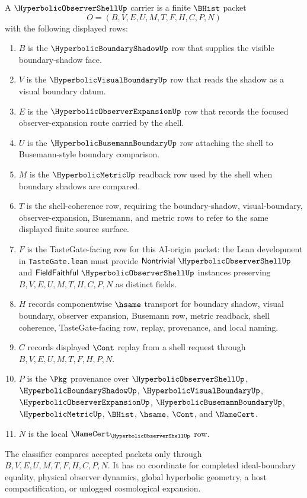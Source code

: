 \begin{definition}
\label{def:hyperbolic-observer-shell-carrier}
A $\HyperbolicObserverShellUp$ carrier is a finite $\BHist$ packet
$$
O=(B,V,E,U,M,T,F,H,C,P,N)
$$
with the following displayed rows:
\begin{enumerate}
\item $B$ is the $\HyperbolicBoundaryShadowUp$ row that supplies the visible boundary-shadow face.
\item $V$ is the $\HyperbolicVisualBoundaryUp$ row that reads the shadow as a visual boundary datum.
\item $E$ is the $\HyperbolicObserverExpansionUp$ row that records the focused observer-expansion route carried by the shell.
\item $U$ is the $\HyperbolicBusemannBoundaryUp$ row attaching the shell to Busemann-style boundary comparison.
\item $M$ is the $\HyperbolicMetricUp$ readback row used by the shell when boundary shadows are compared.
\item $T$ is the shell-coherence row, requiring the boundary-shadow, visual-boundary, observer-expansion, Busemann, and metric rows to refer to the same displayed finite source surface.
\item $F$ is the TasteGate-facing row for this AI-origin packet: the Lean development in \texttt{TasteGate.lean} must provide $\mathsf{Nontrivial}\ \HyperbolicObserverShellUp$ and $\mathsf{FieldFaithful}\ \HyperbolicObserverShellUp$ instances preserving $B,V,E,U,M,T,H,C,P,N$ as distinct fields.
\item $H$ records componentwise $\hsame$ transport for boundary shadow, visual boundary, observer expansion, Busemann row, metric readback, shell coherence, TasteGate-facing row, replay, provenance, and local naming.
\item $C$ records displayed $\Cont$ replay from a shell request through $B,V,E,U,M,T,F,H,P,N$.
\item $P$ is the $\Pkg$ provenance over $\HyperbolicObserverShellUp$, $\HyperbolicBoundaryShadowUp$, $\HyperbolicVisualBoundaryUp$, $\HyperbolicObserverExpansionUp$, $\HyperbolicBusemannBoundaryUp$, $\HyperbolicMetricUp$, $\BHist$, $\hsame$, $\Cont$, and $\NameCert$.
\item $N$ is the local $\NameCert_{\HyperbolicObserverShellUp}$ row.
\end{enumerate}
The classifier compares accepted packets only through $B,V,E,U,M,T,F,H,C,P,N$. It has no coordinate for completed ideal-boundary equality, physical observer dynamics, global hyperbolic geometry, a host compactification, or unlogged cosmological expansion.
\end{definition}

